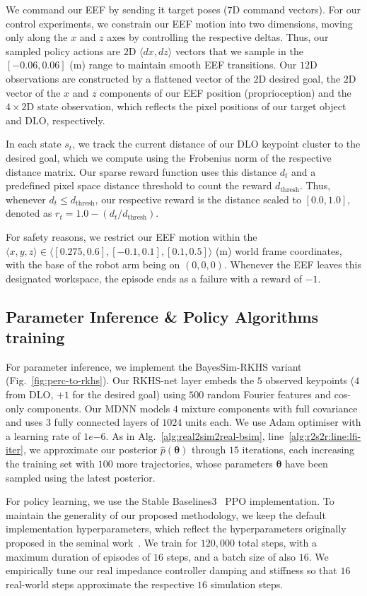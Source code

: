 We command our EEF by sending it target poses ($7$D command vectors). For our control experiments, we constrain our EEF motion into two dimensions, moving only along the $x$ and $z$ axes by controlling the respective deltas. Thus, our sampled policy actions are $2$D $\langle dx, dz \rangle$ vectors that we sample in the $[-0.06, 0.06]$ (m) range to maintain smooth EEF transitions. Our $12$D observations are constructed by a flattened vector of the $2$D desired goal, the $2$D vector of the $x$ and $z$ components of our EEF position (proprioception) and the $4 \times 2$D state observation, which reflects the pixel positions of our target object and DLO, respectively.

In each state $s_t$, we track the current distance of our DLO keypoint cluster to the desired goal, which we compute using the Frobenius norm of the respective distance matrix. Our sparse reward function uses this distance $d_t$ and a predefined pixel space distance threshold to count the reward $d_{\text{thresh}}$. Thus, whenever $d_t \le d_{\text{thresh}}$, our respective reward is the distance scaled to $[0.0, 1.0]$, denoted as $r_t = 1.0 - (d_t / d_{\text{thresh}})$. 

For safety reasons, we restrict our EEF motion within the $\langle x, y, z \rangle \in \langle [0.275, 0.6], [-0.1, 0.1], [0.1, 0.5] \rangle$ (m) world frame coordinates, with the base of the robot arm being on $(0, 0, 0)$. Whenever the EEF leaves this designated workspace, the episode ends as a failure with a reward of $-1$.

\subsection{Parameter Inference \& Policy Algorithms training}
\label{subsec:training-setup}

For parameter inference, we implement the BayesSim-RKHS variant~\cite{antonova2022bayesian} (Fig.~\ref{fig:perc-to-rkhs}). Our RKHS-net layer embeds the $5$ observed keypoints ($4$ from DLO, $+1$ for the desired goal) using $500$ random Fourier features and cos-only components. Our MDNN models $4$ mixture components with full covariance and uses $3$ fully connected layers of $1024$ units each. We use Adam optimiser with a learning rate of $1e$$-6$. As in Alg.~\ref{alg:real2sim2real-bsim}, line~\ref{alg:r2s2r:line:lfi-iter}, we approximate our posterior $\hat{p}(\boldsymbol{\theta})$ through $15$ iterations, each increasing the training set with $100$ more trajectories, whose parameters $\boldsymbol{\theta}$ have been sampled using the latest posterior.

For policy learning, we use the Stable Baselines3~\cite{stable-baselines3} PPO implementation. To maintain the generality of our proposed methodology, we keep the default implementation hyperparameters, which reflect the hyperparameters originally proposed in the seminal work~\cite{schulman2017proximal}. We train for $120,000$ total steps, with a maximum duration of episodes of $16$ steps, and a batch size of also $16$. We empirically tune our real impedance controller damping and stiffness so that $16$ real-world steps approximate the respective $16$ simulation steps.

